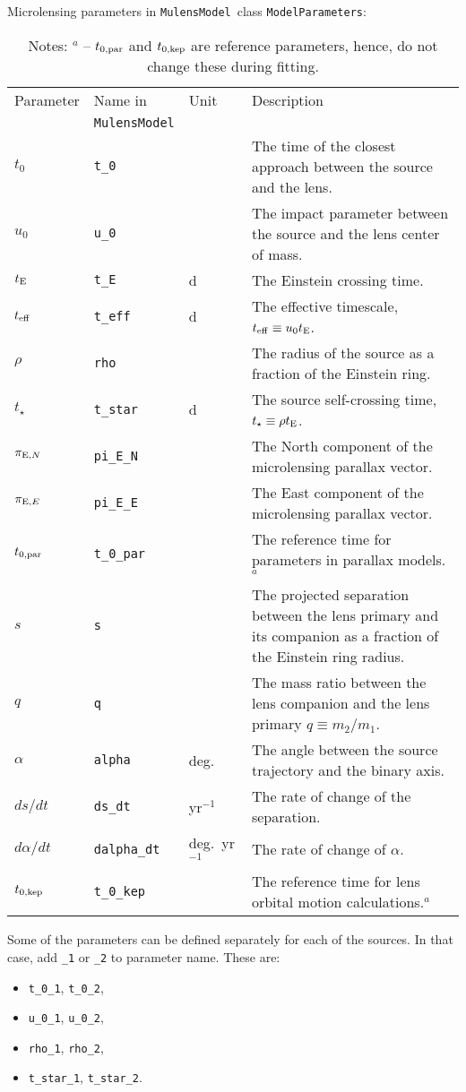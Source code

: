 \documentclass[12pt]{article}
\newcommand\MM{{\tt MulensModel}}
\begin{document}

Microlensing parameters in \MM\, class {\tt ModelParameters}:

\begin{table*}[h]
\begin{tabular}{l l l p{10cm}}
Parameter & Name in &  Unit & Description \\
 & \MM &  & \\
\hline
$t_0$ & {\tt t\_0} & & The time of the closest approach between the source and the lens. \\
$u_0$ & {\tt u\_0} & & The impact parameter between the source and the lens center of mass. \\
$t_{\rm E}$ & {\tt t\_E} & d & The Einstein crossing time. \\
$t_{\rm eff}$ & {\tt t\_eff} & d & The effective timescale, $t_{\rm eff} \equiv u_0 t_{\rm E}$. \\
$\rho$ & {\tt rho} & & The radius of the source as a fraction of the Einstein ring. \\
$t_{\star}$ & {\tt t\_star} & d & The source self-crossing time, $t_\star \equiv \rho t_{\rm E}$. \\
$\pi_{{\rm E}, N}$ & {\tt pi\_E\_N} & & The North component of the microlensing parallax vector. \\
$\pi_{{\rm E}, E}$ & {\tt pi\_E\_E} & & The East component of the microlensing parallax vector. \\
$t_{0,{\rm par}}$ & {\tt t\_0\_par} & & The reference time for parameters in parallax models.$^a$ \\
$s$ & {\tt s} & & The projected separation between the lens primary and its companion as a fraction of the Einstein ring radius. \\
$q$ & {\tt q} & & The mass ratio between the lens companion and the lens primary $q \equiv m_2/m_1$. \\
$\alpha$ & {\tt alpha} & deg. & The angle between the source trajectory and the binary axis. \\
$ds/dt$ & {\tt ds\_dt} & yr$^{-1}$ & The rate of change of the separation. \\
$d\alpha/dt$ & {\tt dalpha\_dt} & deg.~yr$^{-1}$ & The rate of change of $\alpha$. \\
$t_{0,{\rm kep}}$ & {\tt t\_0\_kep} & & The reference time for lens orbital motion calculations.$^a$ \\
\hline
\end{tabular}
\caption{Notes: 
$^a$ -- $t_{0,{\rm par}}$ and $t_{0,{\rm kep}}$ are reference parameters, hence, do not change these during fitting.
}
\end{table*}

Some of the parameters can be defined separately for each of the sources.  
In that case, add {\tt \_1} or {\tt \_2} to parameter name. These are:
\begin{itemize}
\item {\tt t\_0\_1}, {\tt t\_0\_2},
\item {\tt u\_0\_1}, {\tt u\_0\_2},
\item {\tt rho\_1}, {\tt rho\_2},
\item {\tt t\_star\_1}, {\tt t\_star\_2}.
\end{itemize}
\end{document}
